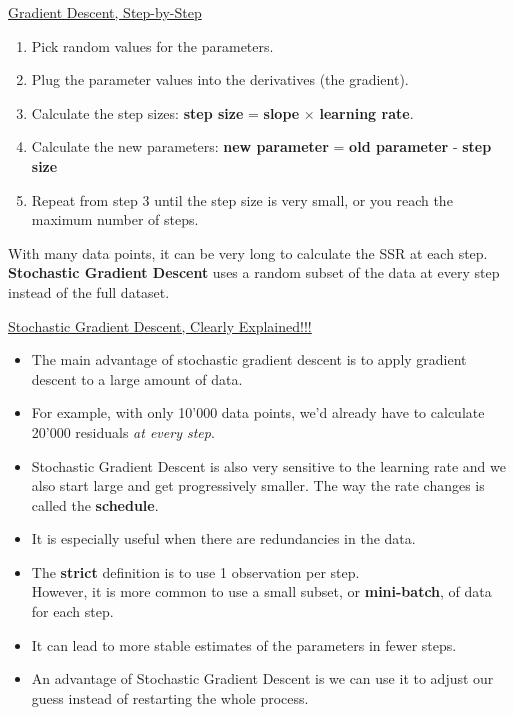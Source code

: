 \documentclass[12pt, titlepage, french]{report}
\begin{document}
\begin{YTB_SUMM_AUTO_NUMB}[label = {SQ-desc-grad}]{\href{https://www.youtube.com/watch?v=sDv4f4s2SB8}{Gradient Descent, Step-by-Step}}
\begin{enumerate}
	\item	Pick random values for the parameters.
	\item	Plug the parameter values into the derivatives (the gradient).
	\item	Calculate the step sizes: \textbf{step size} = \textbf{slope} $\times$ \textbf{learning rate}.
	\item	Calculate the new parameters: \textbf{new parameter} = \textbf{old parameter} -  \textbf{step size}
	\item	Repeat from step 3 until the step size is very small, or you reach the maximum number of steps.
\end{enumerate}

With many data points, it can be very long to calculate the SSR at each step. \textbf{Stochastic Gradient Descent} uses a random subset of the data at every step instead of the full dataset.
\end{YTB_SUMM_AUTO_NUMB}

\begin{YTB_SUMM_AUTO_NUMB}[label = {SQ-desc-grad-sto}]{\href{https://www.youtube.com/watch?v=vMh0zPT0tLI}{Stochastic Gradient Descent, Clearly Explained!!!}}
\begin{itemize}[leftmargin = *]
	\item	The main advantage of stochastic gradient descent is to apply gradient descent to a large amount of data. 
	\item	For example, with only 10'000 data points, we'd already have to calculate 20'000 residuals \textit{at every step}.
	\item	Stochastic Gradient Descent is also very sensitive to the learning rate and we also start large and get progressively smaller. The way the rate changes is called the \textbf{schedule}.
	\item	It is especially useful when there are redundancies in the data.
	\item	The \textbf{strict} definition is to use 1 observation per step.\\
			However, it is more common to use a small subset, or \textbf{mini-batch}, of data for each step.
	\item	It can lead to more stable estimates of the parameters in fewer steps.
	\item	An advantage of Stochastic Gradient Descent is we can use it to adjust our guess instead of restarting the whole process.
\end{itemize}
\end{YTB_SUMM_AUTO_NUMB}
\end{document}
